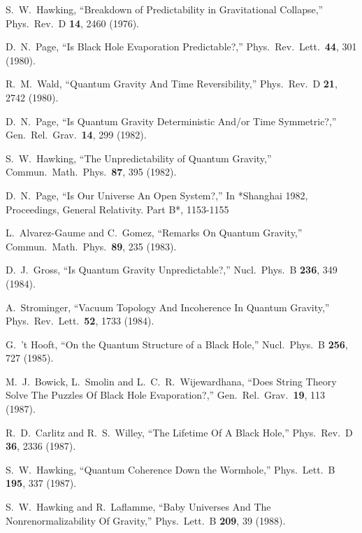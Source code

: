 \documentclass[12pt]{article}
\begin{document}
\begin{thebibliography}{99}

  S.~W.~Hawking,
  ``Breakdown of Predictability in Gravitational Collapse,''
  Phys.\ Rev.\ D {\bf 14}, 2460 (1976).

  D.~N.~Page,
  ``Is Black Hole Evaporation Predictable?,''
  Phys.\ Rev.\ Lett.\  {\bf 44}, 301 (1980).
  
  R.~M.~Wald,
  ``Quantum Gravity And Time Reversibility,''
  Phys.\ Rev.\ D {\bf 21}, 2742 (1980).

  D.~N.~Page,
  ``Is Quantum Gravity Deterministic And/or Time Symmetric?,''
  Gen.\ Rel.\ Grav.\  {\bf 14}, 299 (1982).
  
  S.~W.~Hawking,
  ``The Unpredictability of Quantum Gravity,''
  Commun.\ Math.\ Phys.\  {\bf 87}, 395 (1982).
  
  D.~N.~Page,
  ``Is Our Universe An Open System?,''
  In *Shanghai 1982, Proceedings, General Relativity. Part B*, 1153-1155
  
  L.~Alvarez-Gaume and C.~Gomez,
  ``Remarks On Quantum Gravity,''
  Commun.\ Math.\ Phys.\  {\bf 89}, 235 (1983).

  D.~J.~Gross,
  ``Is Quantum Gravity Unpredictable?,''
  Nucl.\ Phys.\ B {\bf 236}, 349 (1984).
  
  A.~Strominger,
  ``Vacuum Topology And Incoherence In Quantum Gravity,''
  Phys.\ Rev.\ Lett.\  {\bf 52}, 1733 (1984).
  
  G.~'t Hooft,
  ``On the Quantum Structure of a Black Hole,''
  Nucl.\ Phys.\ B {\bf 256}, 727 (1985).

  M.~J.~Bowick, L.~Smolin and L.~C.~R.~Wijewardhana,
  ``Does String Theory Solve The Puzzles Of Black Hole Evaporation?,''
  Gen.\ Rel.\ Grav.\  {\bf 19}, 113 (1987).

  R.~D.~Carlitz and R.~S.~Willey,
  ``The Lifetime Of A Black Hole,''
  Phys.\ Rev.\ D {\bf 36}, 2336 (1987).

  S.~W.~Hawking,
  ``Quantum Coherence Down the Wormhole,''
  Phys.\ Lett.\ B {\bf 195}, 337 (1987).

  S.~W.~Hawking and R.~Laflamme,
  ``Baby Universes And The Nonrenormalizability Of Gravity,''
  Phys.\ Lett.\ B {\bf 209}, 39 (1988).


\end{thebibliography}
\end{document}
